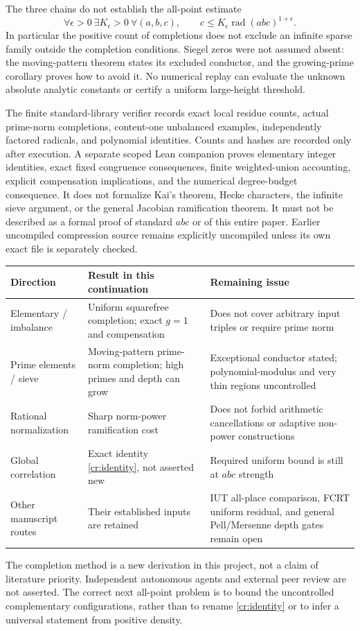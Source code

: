 The three chains do not establish the all-point estimate
\[
 \forall\epsilon>0\ \exists K_\epsilon>0\ \forall(a,b,c),\qquad
 c\le K_\epsilon\operatorname{rad}(abc)^{1+\epsilon}.
\]
In particular the positive count of completions does not exclude an infinite
sparse family outside the completion conditions. Siegel zeros were not
assumed absent: the moving-pattern theorem states its excluded conductor,
and the growing-prime corollary proves how to avoid it. No numerical replay
can evaluate the unknown absolute analytic constants or certify a uniform
large-height threshold.

The finite standard-library verifier records exact local residue counts,
actual prime-norm completions, content-one unbalanced examples, independently
factored radicals, and polynomial identities. Counts and hashes are recorded
only after execution. A separate scoped Lean companion proves elementary
integer identities, exact fixed congruence consequences, finite weighted-union
accounting, explicit compensation implications, and the numerical degree-budget
consequence. It does not formalize Kai's theorem, Hecke characters, the
infinite sieve argument, or the general Jacobian ramification theorem. It
must not be described as a formal proof of standard $abc$ or of this entire
paper. Earlier uncompiled compression source remains explicitly uncompiled
unless its own exact file is separately checked.

\begin{center}\small
\begin{tabular}{p{}p{}p{}}
\hline
Direction & Result in this continuation & Remaining issue\\\hline
Elementary / imbalance & Uniform squarefree completion; exact $g=1$ and compensation & Does not cover arbitrary input triples or require prime norm\\
Prime elements / sieve & Moving-pattern prime-norm completion; high primes and depth can grow & Exceptional conductor stated; polynomial-modulus and very thin regions uncontrolled\\
Rational normalization & Sharp norm-power ramification cost & Does not forbid arithmetic cancellations or adaptive non-power constructions\\
Global correlation & Exact identity \eqref{cr:identity}, not asserted new & Required uniform bound is still at $abc$ strength\\
Other manuscript routes & Their established inputs are retained & IUT all-place comparison, FCRT uniform residual, and general Pell/Mersenne depth gates remain open\\\hline
\end{tabular}
\end{center}

The completion method is a new derivation in this project, not a claim of
literature priority. Independent autonomous agents and external peer review
are not asserted. The correct next all-point problem is to bound the
uncontrolled complementary configurations, rather than to rename
\eqref{cr:identity} or to infer a universal statement from positive density.
